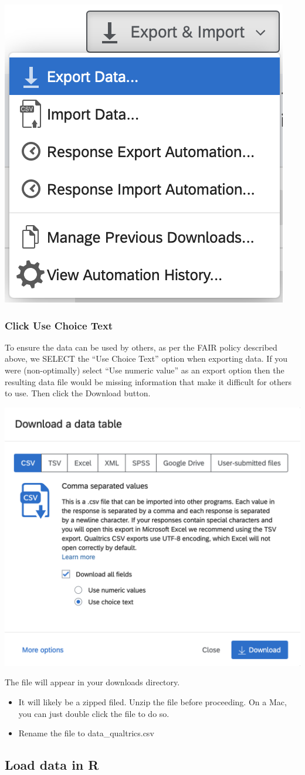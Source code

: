\documentclass[
]{krantz}
\begin{document}
\includegraphics[width=0.2\linewidth]{ch_qualtrics/images/screenshot_export}

\hypertarget{click-use-choice-text}{%
\subsubsection{Click Use Choice Text}\label{click-use-choice-text}}

To ensure the data can be used by others, as per the FAIR policy described above, we SELECT the ``Use Choice Text'' option when exporting data. If you were (non-optimally) select ``Use numeric value'' as an export option then the resulting data file would be missing information that make it difficult for others to use. Then click the Download button.

\includegraphics[width=0.6\linewidth]{ch_qualtrics/images/screenshot_export_choice}

The file will appear in your downloads directory.

\begin{itemize}
\item
  It will likely be a zipped filed. Unzip the file before proceeding. On a Mac, you can just double click the file to do so.
\item
  Rename the file to data\_qualtrics.csv
\end{itemize}

\hypertarget{load-data-in-r}{%
\subsection{Load data in R}\label{load-data-in-r}}
\end{document}
